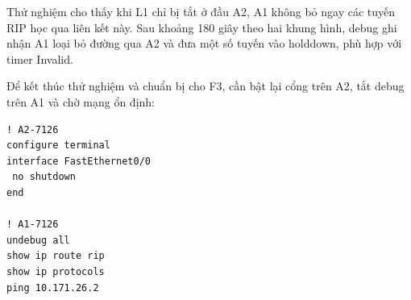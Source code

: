 Thử nghiệm cho thấy khi L1 chỉ bị tắt ở đầu A2,
A1 không bỏ ngay các tuyến RIP học qua liên kết này.
Sau khoảng 180 giây theo hai khung hình,
debug ghi nhận A1 loại bỏ đường qua A2 và đưa
một số tuyến vào holddown, phù hợp với timer Invalid.

Để kết thúc thử nghiệm và chuẩn bị cho F3, cần bật lại
cổng trên A2, tắt debug trên A1 và chờ mạng ổn định:

\begin{lstlisting}
! A2-7126
configure terminal
interface FastEthernet0/0
 no shutdown
end

! A1-7126
undebug all
show ip route rip
show ip protocols
ping 10.171.26.2
\end{lstlisting}


\newpage
